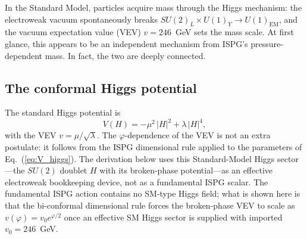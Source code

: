 \documentclass[aps,prd,onecolumn,superscriptaddress,nofootinbib,showpacs,12pt,notitlepage]{revtex4-2}
\begin{document}
In the Standard Model, particles acquire mass through the
Higgs mechanism: the electroweak vacuum spontaneously breaks
$SU(2)_L \times U(1)_Y \to U(1)_{\mathrm{EM}}$, and
the vacuum expectation value (VEV) $v = 246$~GeV sets the
mass scale.  At first glance, this appears to be an
independent mechanism from ISPG's pressure-dependent mass.
In fact, the two are deeply connected.

\subsection{The conformal Higgs potential}
\label{sec:conformal_higgs}

The standard Higgs potential is
\begin{equation}\label{eq:V_higgs}
  V(H) = -\mu^{2}\,|H|^{2} + \lambda\,|H|^{4},
\end{equation}
with the VEV $v = \mu/\sqrt{\lambda}$.  The
$\varphi$-dependence of the VEV is not an extra
postulate: it follows from the ISPG dimensional rule
applied to the parameters of Eq.~(\ref{eq:V_higgs}).
The derivation below uses this Standard-Model Higgs
sector---the $SU(2)$ doublet $H$ with its broken-phase
potential---as an effective electroweak bookkeeping
device, not as a fundamental ISPG scalar.  The
fundamental ISPG action contains no SM-type Higgs field;
what is shown here is that the bi-conformal dimensional
rule forces the broken-phase VEV to scale as
$v(\varphi)=v_0e^{\varphi/2}$ once an effective SM Higgs
sector is supplied with imported $v_0=246$~GeV.
\end{document}

